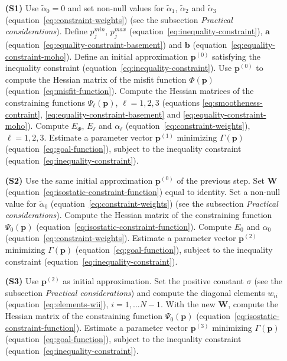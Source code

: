 \documentclass[manuscript]{geophysics}
\begin{document}
\begin{enumerate}
	\item [\textbf{(S1)}] Use $\tilde{\alpha}_{0} = 0$ and set non-null values for 
	$\tilde{\alpha}_{1}$, $\tilde{\alpha}_{2}$ and $\tilde{\alpha}_{3}$ 
	(equation~\ref{eq:constraint-weights})
	(see the subsection \textit{Practical considerations}).
	Define $p_{j}^{min}$, $p_{j}^{max}$ (equation~\ref{eq:inequality-constraint}),
	$\mathbf{a}$ (equation~\ref{eq:equality-constraint-basement}) and
	$\mathbf{b}$ (equation~\ref{eq:equality-constraint-moho}).
	Define an initial approximation $\mathbf{p}^{(0)}$ satisfying the inequality constraint
	(equation~\ref{eq:inequality-constraint}). Use $\mathbf{p}^{(0)}$ to compute the 
	Hessian matrix of the misfit function $\Phi(\mathbf{p})$ (equation~\ref{eq:misfit-function}).
	Compute the Hessian matrices of the constraining functions $\Psi_{\ell}(\mathbf{p})$, 
	$\ell = 1, 2, 3$ (equations \ref{eq:smootheness-contraint},
	\ref{eq:equality-constraint-basement} and \ref{eq:equality-constraint-moho}). 
	Compute $E_{\Phi}$, $E_{\ell}$ and $\alpha_{\ell}$
	(equation~\ref{eq:constraint-weights}), $\ell = 1, 2, 3$. 
	Estimate a parameter vector $\mathbf{p}^{(1)}$
	minimizing $\Gamma(\mathbf{p})$ (equation~\ref{eq:goal-function}), 
	subject to the inequality constraint (equation~\ref{eq:inequality-constraint}).
	\item [\textbf{(S2)}] Use the same initial approximation $\mathbf{p}^{(0)}$
	of the previous step. Set $\mathbf{W}$ (equation~\ref{eq:isostatic-constraint-function})
	equal to identity. Set a non-null value for $\tilde{\alpha}_{0}$
	(equation~\ref{eq:constraint-weights})
	(see the subsection \textit{Practical considerations}).
	Compute the Hessian matrix of the constraining function $\Psi_{0}(\mathbf{p})$
	(equation~\ref{eq:isostatic-constraint-function}).
	Compute $E_{0}$ and $\alpha_{0}$ (equation~\ref{eq:constraint-weights}).
	Estimate a parameter vector $\mathbf{p}^{(2)}$ minimizing $\Gamma(\mathbf{p})$ 
	(equation~\ref{eq:goal-function}), subject to the inequality constraint 
	(equation~\ref{eq:inequality-constraint}).
	\item [\textbf{(S3)}] Use $\mathbf{p}^{(2)}$ as initial approximation.
	Set the positive constant $\sigma$ 
	(see the subsection \textit{Practical considerations}) and compute the 
	diagonal elements $w_{ii}$ (equation~\ref{eq:elements-wii}), $i = 1, \dots N-1$.
	With the new $\mathbf{W}$, compute the Hessian matrix of the constraining function
	$\Psi_{0}(\mathbf{p})$ (equation~\ref{eq:isostatic-constraint-function}).
	Estimate a parameter vector $\mathbf{p}^{(3)}$ minimizing $\Gamma(\mathbf{p})$ 
	(equation~\ref{eq:goal-function}), subject to the inequality constraint 
	(equation~\ref{eq:inequality-constraint}).
\end{enumerate}
\end{document}
